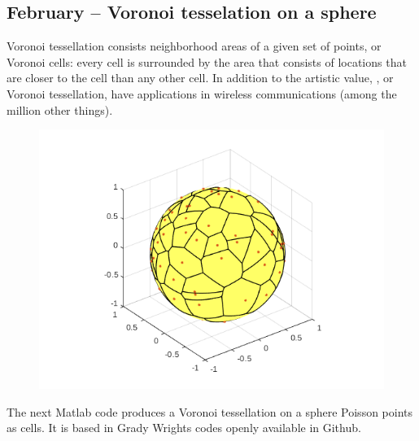 \documentclass{article}
\begin{document}
\subsection{February – Voronoi tesselation on a sphere}

Voronoi tessellation consists neighborhood areas of a given set of points, or Voronoi cells: every cell is surrounded by the area that consists of locations that are closer to the cell than any other cell. In addition to the artistic value, , or Voronoi tessellation, have applications in wireless communications (among the million other things). 

\begin{figure}
  \includegraphics[width=\linewidth]{voronoionsphere.png}
\end{figure}


The next Matlab code produces a Voronoi tessellation on a sphere Poisson points as cells. It is based in Grady Wrights codes openly available in Github. 
\end{document}
